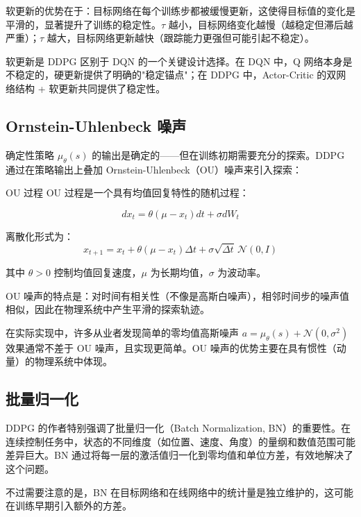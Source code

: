 软更新的优势在于：目标网络在每个训练步都被缓慢更新，这使得目标值的变化是平滑的，显著提升了训练的稳定性。$\tau$ 越小，目标网络变化越慢（越稳定但滞后越严重）；$\tau$ 越大，目标网络更新越快（跟踪能力更强但可能引起不稳定）。

\begin{remark}
软更新是 DDPG 区别于 DQN 的一个关键设计选择。在 DQN 中，Q 网络本身是不稳定的，硬更新提供了明确的"稳定锚点"；在 DDPG 中，Actor-Critic 的双网络结构 + 软更新共同提供了稳定性。
\end{remark}

\subsection{Ornstein-Uhlenbeck 噪声}

确定性策略 $\mu_\theta(s)$ 的输出是确定的——但在训练初期需要充分的探索。DDPG 通过在策略输出上叠加 Ornstein-Uhlenbeck（OU）噪声来引入探索：

\begin{mydefinition}{OU 过程}
OU 过程是一个具有均值回复特性的随机过程：

\[
dx_t = \theta (\mu - x_t) dt + \sigma dW_t
\]

离散化形式为：
\[
x_{t+1} = x_t + \theta (\mu - x_t) \Delta t + \sigma \sqrt{\Delta t} \, \mathcal{N}(0, I)
\]

其中 $\theta > 0$ 控制均值回复速度，$\mu$ 为长期均值，$\sigma$ 为波动率。
\end{mydefinition}

OU 噪声的特点是：对时间有相关性（不像是高斯白噪声），相邻时间步的噪声值相似，因此在物理系统中产生平滑的探索轨迹。

\begin{remark}
在实际实现中，许多从业者发现简单的零均值高斯噪声 $a = \mu_\theta(s) + \mathcal{N}(0, \sigma^2)$ 效果通常不差于 OU 噪声，且实现更简单。OU 噪声的优势主要在具有惯性（动量）的物理系统中体现。
\end{remark}

\subsection{批量归一化}

DDPG 的作者特别强调了批量归一化（Batch Normalization, BN）的重要性。在连续控制任务中，状态的不同维度（如位置、速度、角度）的量纲和数值范围可能差异巨大。BN 通过将每一层的激活值归一化到零均值和单位方差，有效地解决了这个问题。

不过需要注意的是，BN 在目标网络和在线网络中的统计量是独立维护的，这可能在训练早期引入额外的方差。

